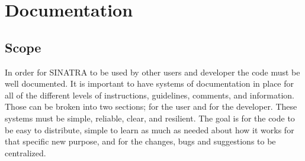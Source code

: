 \chapter{Documentation}
\section{Scope}
In order for SINATRA to be used by other users and developer the code must be well documented. It is important to have systems of documentation in place for all of the different levels of instructions, guidelines, comments, and information. Those can be broken into two sections; for the user and for the developer. These systems must be simple, reliable, clear, and resilient. The goal is for the code to be easy to distribute, simple to learn as much as needed about how it works for that specific new purpose, and for the changes, bugs and suggestions to be centralized.
